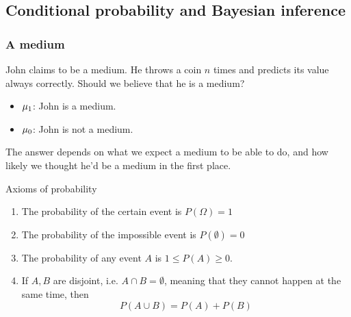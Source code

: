 \subsection{Conditional probability and Bayesian inference}
\begin{frame}
  \frametitle{A medium}
  \begin{example}
    John claims to be a medium. He throws a coin $n$ times and predicts its value always correctly. Should we believe that he is a medium?
  \end{example}
  \begin{itemize}
  \item $\mu_1$: John is a medium.
  \item $\mu_0$: John is not a medium.
  \end{itemize}
  The answer depends on what we \alert{expect} a medium to be able to do, and how likely we thought he'd be a medium in the first place.
\end{frame}
\begin{frame}
  \begin{block}{Axioms of probability}
    \begin{enumerate}
    \item The probability of the certain event is $P(\Omega) = 1$
    \item The probability of the impossible event is
      $P(\emptyset) = 0$
    \item The probability of any event $A$ is $1 \leq P(A) \geq 0$.
    \item If $A, B$ are disjoint, i.e. $A \cap B = \emptyset$, meaning
      that they cannot happen at the same time, then
      \[
        P(A \cup B) = P(A) + P(B)
      \]
    \end{enumerate}
  \end{block}
\end{frame}

